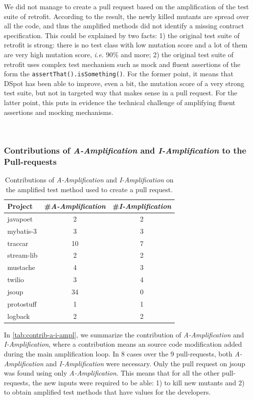 \documentclass[table,xcdraw,smallextended]{svjour3}
\newcommand{\Iampl}{\emph{I-Amplification}\xspace}
\newcommand{\Aampl}{\emph{A-Amplification}\xspace}
\newcommand{\ie}{\textit{i.e.}\xspace}
\newcommand{\dspot}{DSpot\xspace}
\newcommand{\ms}{mutation score\xspace}
\begin{document}
We did not manage to create a pull request based on the amplification of the test suite of retrofit. According to the result, the newly killed mutants are spread over all the code, and thus the amplified methods did not identify a missing contract specification. This could be explained by two facts: 1) the original test suite of retrofit is strong: there is no test class with low \ms and a lot of them are very high \ms, \ie 90\% and more; 2) the original test suite of retrofit uses complex test mechanism such as mock and fluent assertions of the form the \texttt{assertThat().isSomething()}. For the former point, it means that \dspot has been able to improve, even a bit, the \ms of a very strong test suite, but not in targeted way that makes sense in a pull request. For the latter point, this puts in evidence the technical challenge of amplifying fluent assertions and mocking mechanisms.

~\\

\subsubsection{Contributions of \Aampl and \Iampl to the Pull-requests}

\begin{table}[]
\caption{Contributions of \Aampl and \Iampl on the amplified test method used to create a pull request.}
\label{tab:contrib-a-i-ampl}
\centering\begin{tabular}{lcc}
\hline
Project & \#\Aampl &  \#\Iampl \\
\hline
javapoet & 2 & 2 \\
mybatis-3 & 3 & 3 \\
traccar & 10 & 7 \\
stream-lib & 2 & 2 \\
mustache & 4 & 3 \\
twilio & 3 & 4 \\
jsoup & 34 & 0 \\
protostuff & 1 & 1 \\
logback & 2 & 2 \\
\hline
\end{tabular}
\end{table}

In \autoref{tab:contrib-a-i-ampl}, we summarize the contribution of \Aampl and \Iampl, where a contribution means an source code modification added during the main amplification loop. In 8 cases over the 9 pull-requests, both \Aampl and \Iampl were necessary. Only the pull request on jsoup was found using only \Aampl. This means that for all the other pull-requests, the new inputs were required to be able: 1) to kill new mutants and 2) to obtain amplified test methods that have values for the developers.
\end{document}

